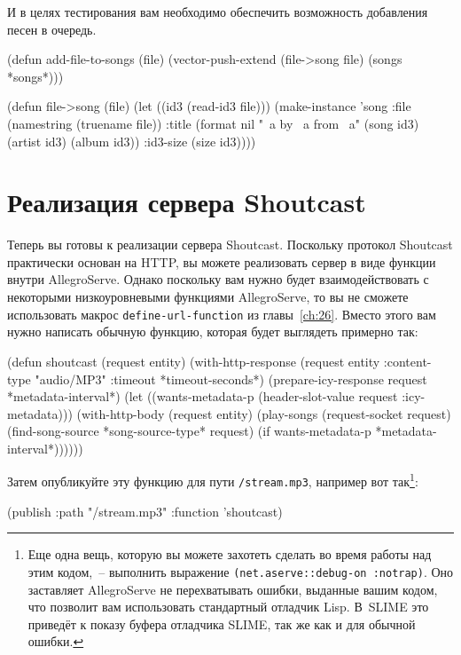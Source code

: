 И в целях тестирования вам необходимо обеспечить возможность добавления песен в очередь.

\begin{myverb}
(defun add-file-to-songs (file)
  (vector-push-extend (file->song file) (songs *songs*)))

(defun file->song (file)
  (let ((id3 (read-id3 file)))
    (make-instance 
     'song
     :file (namestring (truename file))
     :title (format nil "~a by ~a from ~a" (song id3) (artist id3) (album id3))
     :id3-size (size id3))))
\end{myverb}

\section{Реализация сервера Shoutcast}

Теперь вы готовы к реализации сервера Shoutcast. Поскольку протокол Shoutcast практически
основан на HTTP, вы можете реализовать сервер в виде функции внутри AllegroServe.  Однако
поскольку вам нужно будет взаимодействовать с некоторыми низкоуровневыми функциями
AllegroServe, то вы не сможете использовать макрос \lstinline{define-url-function} из
главы~\ref{ch:26}. Вместо этого вам нужно написать обычную функцию, которая будет
выглядеть примерно так:

\begin{myverb}
(defun shoutcast (request entity)
  (with-http-response
      (request entity :content-type "audio/MP3" :timeout *timeout-seconds*)
    (prepare-icy-response request *metadata-interval*)
    (let ((wants-metadata-p (header-slot-value request :icy-metadata)))
      (with-http-body (request entity)
        (play-songs 
         (request-socket request)
         (find-song-source *song-source-type* request)
         (if wants-metadata-p *metadata-interval*))))))
\end{myverb}

Затем опубликуйте эту функцию для пути \lstinline{/stream.mp3}, например вот так\footnote{Еще
  одна вещь, которую вы можете захотеть сделать во время работы над этим кодом,~--
  выполнить выражение \lstinline{(net.aserve::debug-on :notrap)}.  Оно заставляет AllegroServe
  не перехватывать ошибки, выданные вашим кодом, что позволит вам использовать стандартный
  отладчик Lisp.  В~SLIME это приведёт к показу буфера отладчика SLIME, так же как и для
  обычной ошибки.}:

\begin{myverb}
(publish :path "/stream.mp3" :function 'shoutcast)
\end{myverb}

